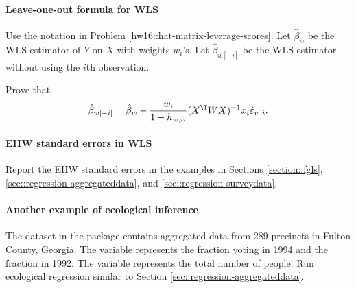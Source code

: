 \paragraph{Leave-one-out formula for WLS}
\label{hw16::loo-for-wls}


Use the notation in Problem \ref{hw16::hat-matrix-leverage-scores}. 
Let $\hat\beta_w$ be the WLS estimator of $Y$ on $X$ with weights $w_i$'s. Let $\hat{\beta}_{w[-i]}$ be the WLS estimator without using the $i$th observation. 

Prove that 
$$
\hat{\beta}_{w[-i]} = \hat\beta_w - \frac{ w_i }{ 1-h_{w,ii} }  (X^{\T} W X)^{-1} x_i \hat{\varepsilon}_{w,i} .
$$







\paragraph{EHW standard errors in WLS}\label{hw16::ehw-wls-empirical}

Report the EHW standard errors in the examples in Sections \ref{section::fgls}, \ref{sec::regression-aggregateddata}, and \ref{sec::regression-surveydata}. 


 
 
 
\paragraph{Another example of ecological inference}\label{hw16::ecological-regression2}

The  dataset in the  package contains aggregated data from 289 precincts in Fulton County, Georgia. The variable  represents the fraction voting in 1994 and  the fraction in 1992. The variable  represents the total number of people. Run ecological regression similar to   Section \ref{sec::regression-aggregateddata}. 



